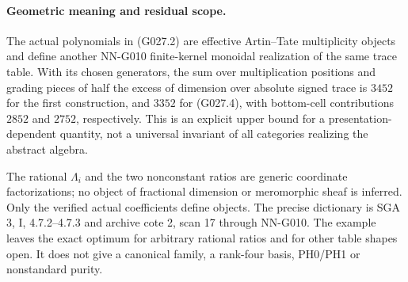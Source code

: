 \paragraph{Geometric meaning and residual scope.}
The actual polynomials in (G027.2) are effective
Artin--Tate multiplicity objects and define another
NN-G010 finite-kernel monoidal realization of the
same trace table. With its chosen generators, the
sum over multiplication positions and grading pieces
of half the excess of dimension over absolute signed
trace is $3452$ for the first construction, and $3352$
for (G027.4), with bottom-cell contributions $2852$
and $2752$, respectively.
This is an explicit upper bound for a presentation-dependent
quantity, not a universal invariant of all categories
realizing the abstract algebra.

The rational $\Lambda_i$ and the two nonconstant ratios
are generic coordinate factorizations; no object of
fractional dimension or meromorphic sheaf is inferred.
Only the verified actual coefficients define objects.
The precise dictionary is SGA 3, I, 4.7.2--4.7.3 and
archive cote 2, scan 17 through NN-G010. The example
leaves the exact optimum for arbitrary rational ratios
and for other table shapes open. It does not give a
canonical family, a rank-four basis, PH0/PH1 or
nonstandard purity.


